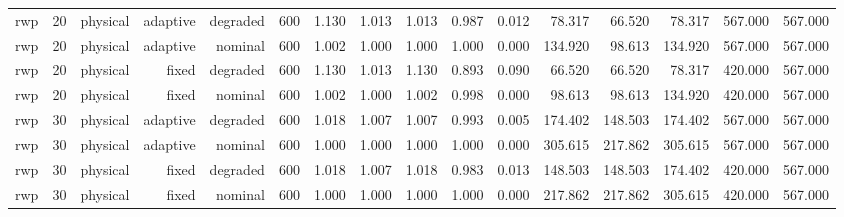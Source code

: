 \begin{tabular}{lrrrrrrrrrrrrrrr}
rwp & 20 & physical & adaptive & degraded & 600 & 1.130 & 1.013 & 1.013 & 0.987 & 0.012 & 78.317 & 66.520 & 78.317 & 567.000 & 567.000 \\
rwp & 20 & physical & adaptive & nominal & 600 & 1.002 & 1.000 & 1.000 & 1.000 & 0.000 & 134.920 & 98.613 & 134.920 & 567.000 & 567.000 \\
rwp & 20 & physical & fixed & degraded & 600 & 1.130 & 1.013 & 1.130 & 0.893 & 0.090 & 66.520 & 66.520 & 78.317 & 420.000 & 567.000 \\
rwp & 20 & physical & fixed & nominal & 600 & 1.002 & 1.000 & 1.002 & 0.998 & 0.000 & 98.613 & 98.613 & 134.920 & 420.000 & 567.000 \\
rwp & 30 & physical & adaptive & degraded & 600 & 1.018 & 1.007 & 1.007 & 0.993 & 0.005 & 174.402 & 148.503 & 174.402 & 567.000 & 567.000 \\
rwp & 30 & physical & adaptive & nominal & 600 & 1.000 & 1.000 & 1.000 & 1.000 & 0.000 & 305.615 & 217.862 & 305.615 & 567.000 & 567.000 \\
rwp & 30 & physical & fixed & degraded & 600 & 1.018 & 1.007 & 1.018 & 0.983 & 0.013 & 148.503 & 148.503 & 174.402 & 420.000 & 567.000 \\
rwp & 30 & physical & fixed & nominal & 600 & 1.000 & 1.000 & 1.000 & 1.000 & 0.000 & 217.862 & 217.862 & 305.615 & 420.000 & 567.000 \\
\bottomrule
\end{tabular}